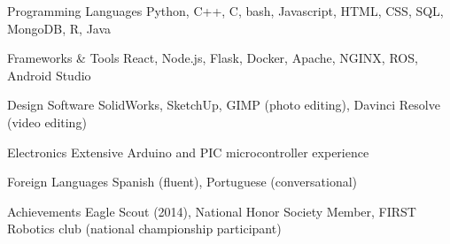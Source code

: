 
\begin{cvskills}
  \cvskill
    {Programming Languages} %
    {Python, C++, C, bash, Javascript, HTML, CSS, SQL, MongoDB, R, Java} %

  \cvskill
    {Frameworks \& Tools} %
    {React, Node.js, Flask, Docker, Apache, NGINX, ROS, Android Studio} %

  \cvskill
    {Design Software}
    {SolidWorks, SketchUp, GIMP (photo editing), Davinci Resolve (video editing)}

  \cvskill
    {Electronics}
    {Extensive Arduino and PIC microcontroller experience}

  \cvskill
    {Foreign Languages}
    {Spanish (fluent), Portuguese (conversational)}

  \cvskill
    {Achievements}
    {Eagle Scout (2014), National Honor Society Member, FIRST Robotics club (national championship participant)}
\end{cvskills}
